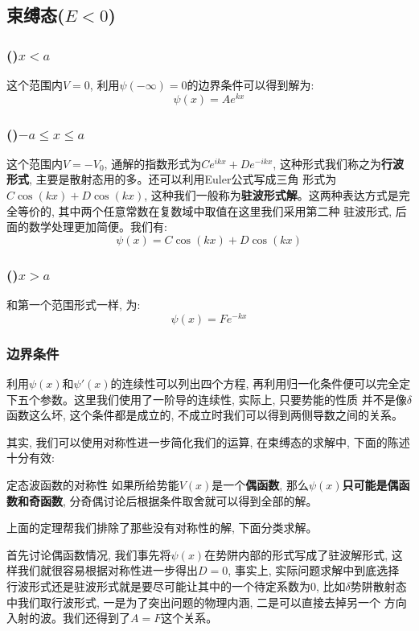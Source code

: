\documentclass[a4paper,zihao=-4,linespread=1]{ctexrep}
\begin{document}
    \subsection*{束缚态($E<0$)}
    \subsubsection*{()$x<a$}
    这个范围内$V=0$, 利用$\psi(-\infty)=0$的边界条件可以得到解为:$$\psi(x)=Ae^{kx}$$
    \subsubsection*{()$-a\leq x\leq a$}
    这个范围内$V=-V_0$, 通解的指数形式为$Ce^{ikx}+De^{-ikx}$, 这种形式我们称之为\textbf{行波形式}, 主要是散射态用的多。还可以利用Euler公式写成三角
    形式为$C\cos (kx)+D\cos (kx)$, 这种我们一般称为\textbf{驻波形式解}。这两种表达方式是完全等价的, 其中两个任意常数在复数域中取值在这里我们采用第二种
    驻波形式, 后面的数学处理更加简便。我们有:$$\psi(x)=C\cos (kx)+D\cos (kx)$$
    \subsubsection*{()$x>a$}
    和第一个范围形式一样, 为:$$\psi(x)=Fe^{-kx}$$
    \subsubsection*{边界条件}
    利用$\psi(x)$和$\psi\prime(x)$的连续性可以列出四个方程, 再利用归一化条件便可以完全定下五个参数。这里我们使用了一阶导的连续性, 实际上, 只要势能的性质
    并不是像$\delta$函数这么坏, 这个条件都是成立的, 不成立时我们可以得到两侧导数之间的关系。

    其实, 我们可以使用对称性进一步简化我们的运算, 在束缚态的求解中, 下面的陈述十分有效:
    \begin{proposition}{定态波函数的对称性}
        如果所给势能$V(x)$是一个\textbf{偶函数}, 那么$\psi(x)$\textbf{只可能是偶函数和奇函数}, 分奇偶讨论后根据条件取舍就可以得到全部的解。
    \end{proposition}
    上面的定理帮我们排除了那些没有对称性的解, 下面分类求解。
    
    首先讨论偶函数情况, 我们事先将$\psi(x)$在势阱内部的形式写成了驻波解形式, 这样我们就很容易根据对称性进一步得出$D=0$, 事实上, 实际问题求解中到底选择
    行波形式还是驻波形式就是要尽可能让其中的一个待定系数为$0$, 比如$\delta$势阱散射态中我们取行波形式, 一是为了突出问题的物理内涵, 二是可以直接去掉另一个
    方向入射的波。我们还得到了$A=F$这个关系。
\end{document}
